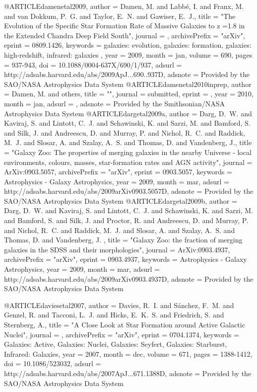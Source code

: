 {{{{{{{{{{{{{{{@ARTICLE{damenetal2009,
   author = {{Damen}, M. and {Labb{\'e}}, I. and {Franx}, M. and {van Dokkum}, P.~G. and 
	{Taylor}, E.~N. and {Gawiser}, E.~J.},
    title = "{The Evolution of the Specific Star Formation Rate of Massive Galaxies to z =1.8 in the Extended Chandra Deep Field South}",
  journal = {\apj},
archivePrefix = "arXiv",
   eprint = {0809.1426},
 keywords = {galaxies: evolution, galaxies: formation, galaxies: high-redshift, infrared: galaxies },
     year = 2009,
    month = jan,
   volume = 690,
    pages = {937-943},
      doi = {10.1088/0004-637X/690/1/937},
   adsurl = {http://adsabs.harvard.edu/abs/2009ApJ...690..937D},
  adsnote = {Provided by the SAO/NASA Astrophysics Data System}
}
@ARTICLE{damenetal2010inprep,
   author = {{Damen}, M. and others},
    title = "{}",
  journal = {submitted},
   eprint = {},
         year = 2010,
    month = jan,
   adsurl = {},
  adsnote = {Provided by the Smithsonian/NASA Astrophysics Data System}
}
@ARTICLE{dargetal2009a,
   author = {{Darg}, D.~W. and {Kaviraj}, S. and {Lintott}, C.~J. and {Schawinski}, K. and 
	{Sarzi}, M. and {Bamford}, S. and {Silk}, J. and {Andreescu}, D. and 
	{Murray}, P. and {Nichol}, R.~C. and {Raddick}, M.~J. and {Slosar}, A. and 
	{Szalay}, A.~S. and {Thomas}, D. and {Vandenberg}, J.},
    title = "{Galaxy Zoo: The properties of merging galaxies in the nearby Universe - local environments, colours, masses, star-formation rates and AGN activity}",
  journal = {ArXiv:0903.5057},
archivePrefix = "arXiv",
   eprint = {0903.5057},
 keywords = {Astrophysics - Galaxy Astrophysics},
     year = 2009,
    month = mar,
   adsurl = {http://adsabs.harvard.edu/abs/2009arXiv0903.5057D},
  adsnote = {Provided by the SAO/NASA Astrophysics Data System}
}
@ARTICLE{dargetal2009b, 
   author = {{Darg}, D.~W. and {Kaviraj}, S. and {Lintott}, C.~J. and {Schawinski}, K. and 
	{Sarzi}, M. and {Bamford}, S. and {Silk}, J. and {Proctor}, R. and 
	{Andreescu}, D. and {Murray}, P. and {Nichol}, R.~C. and {Raddick}, M.~J. and 
	{Slosar}, A. and {Szalay}, A.~S. and {Thomas}, D. and {Vandenberg}, J.
	},
    title = "{Galaxy Zoo: the fraction of merging galaxies in the SDSS and their morphologies}",
  journal = {ArXiv:0903.4937},
archivePrefix = "arXiv",
   eprint = {0903.4937},
 keywords = {Astrophysics - Galaxy Astrophysics},
     year = 2009,
    month = mar,
   adsurl = {http://adsabs.harvard.edu/abs/2009arXiv0903.4937D},
  adsnote = {Provided by the SAO/NASA Astrophysics Data System}
}

@ARTICLE{daviesetal2007,
   author = {{Davies}, R.~I. and {S{\'a}nchez}, F.~M. and {Genzel}, R. and 
	{Tacconi}, L.~J. and {Hicks}, E.~K.~S. and {Friedrich}, S. and 
	{Sternberg}, A.},
    title = "{A Close Look at Star Formation around Active Galactic Nuclei}",
  journal = {\apj},
archivePrefix = "arXiv",
   eprint = {0704.1374},
 keywords = {Galaxies: Active, Galaxies: Nuclei, Galaxies: Seyfert, Galaxies: Starburst, Infrared: Galaxies},
     year = 2007,
    month = dec,
   volume = 671,
    pages = {1388-1412},
      doi = {10.1086/523032},
   adsurl = {http://adsabs.harvard.edu/abs/2007ApJ...671.1388D},
  adsnote = {Provided by the SAO/NASA Astrophysics Data System}
}



}}}}}}}}}}}}}}}
